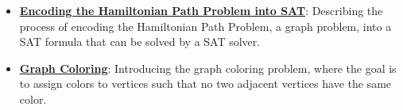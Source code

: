 \documentclass{article}%
\begin{document}
\begin{itemize}[leftmargin=*]
\item \href{https://purdue.brightspace.com/d2l/common/assets/pdfjs-d2l-dist/1.0.14-legacy/web/viewer.html?file=\%2Fcontent\%2Fenforced\%2F1095467-wl.202510.CS.24300.001\%2F15L2-SAT.pdf\%3Fou\%3D1095467\&lang=en-us\&container=d2l-fileviewer-rendered-pdf\&fullscreen=d2l-fileviewer-rendered-pdf-dialog\&height=667#page=40}{\textbf{Encoding the Hamiltonian Path Problem into SAT}}: Describing the process of encoding the Hamiltonian Path Problem, a graph problem, into a SAT formula that can be solved by a SAT solver.%
\item \href{https://purdue.brightspace.com/d2l/common/assets/pdfjs-d2l-dist/1.0.14-legacy/web/viewer.html?file=\%2Fcontent\%2Fenforced\%2F1095467-wl.202510.CS.24300.001\%2F15L2-SAT.pdf\%3Fou\%3D1095467\&lang=en-us\&container=d2l-fileviewer-rendered-pdf\&fullscreen=d2l-fileviewer-rendered-pdf-dialog\&height=667#page=47}{\textbf{Graph Coloring}}: Introducing the graph coloring problem, where the goal is to assign colors to vertices such that no two adjacent vertices have the same color.%
\end{itemize}%
\end{document}
